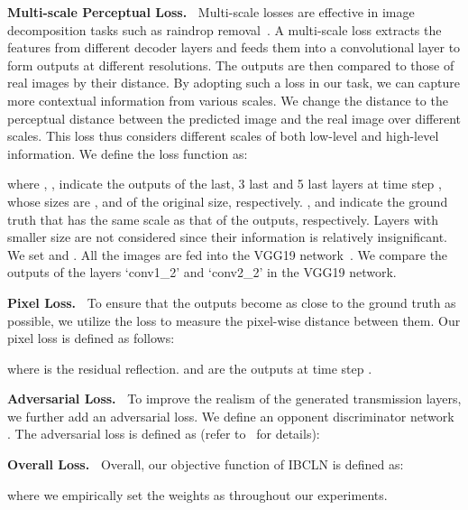 \documentclass[10pt,twocolumn,letterpaper]{article}
\begin{document}
\noindent \textbf{Multi-scale Perceptual Loss.~}
Multi-scale losses are effective in image decomposition tasks such as raindrop removal~\cite{qian2018attentive}. A multi-scale loss extracts the features from different decoder layers and feeds them into a convolutional layer to form outputs at different resolutions. The outputs are then compared to those of real images by their  distance. By adopting such a loss in our task, we can capture more contextual information from various scales. We change the  distance to the perceptual distance between the predicted image and the real image over different scales. This loss thus considers different scales of both low-level and high-level information. 
We define the loss function as:

where , ,  indicate the outputs of the last, 3 last and 5 last layers at time step , whose sizes are ,  and  of the original size, respectively. ,  and  indicate the ground truth that has the same scale as that of the outputs, respectively. Layers with smaller size are not considered since their information is relatively insignificant. We set  and . All the images are fed into the VGG19 network~\cite{simonyan2014very}. We compare the outputs of the layers `conv1\_2' and `conv2\_2’ in the VGG19 network.

\noindent \textbf{Pixel Loss.~}
To ensure that the outputs become as close to the ground truth as possible, we utilize the  loss to measure the pixel-wise distance between them. Our pixel loss is defined as follows: 

where  is the residual reflection.  and  are the outputs at time step .

\noindent\textbf{Adversarial Loss.~}  
To improve the realism of the generated transmission layers, we further add an adversarial loss. We define an opponent discriminator network . The adversarial loss is defined as (refer to~\cite{zhang2018single} for details):
  
    
\noindent\textbf{Overall Loss.~}     
Overall, our objective function of IBCLN is defined as:
 
where we empirically set the weights as   throughout our experiments.
\end{document}
